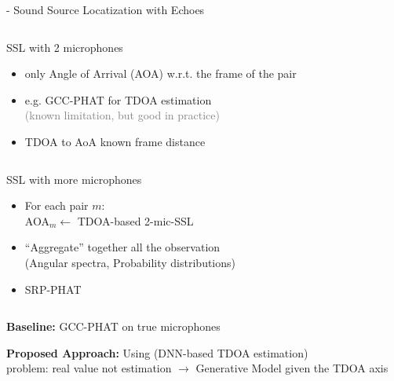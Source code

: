 \begin{frame}{\mirage - Sound Source Locatization with Echoes}

    \begin{columns}
        \begin{block}{SSL with 2 microphones}
            \begin{itemize}
                \item[1.] only Angle of Arrival (AOA) w.r.t. the frame of the pair
                \item e.g. GCC-PHAT for TDOA estimation
                \\\textcolor{gray}{(known limitation, but good in practice)}
                \item TDOA to AoA known frame distance
            \end{itemize}
        \end{block}
    \end{columns}

    \begin{columns}
        \begin{block}{SSL with more microphones}
            \begin{itemize}
                \item[1.] For each pair $m$:
                \\\hspace{1em} AOA$_m \gets$ TDOA-based 2-mic-SSL
                \item[2.] ``Aggregate''  together all the observation
                \\(Angular spectra, Probability distributions)
                \item[eg.] SRP-PHAT
            \end{itemize}
        \end{block}
    \end{columns}

    \begin{block}{\textbf{Baseline:}}
        GCC-PHAT on true microphones
    \end{block}

    \begin{block}{\textbf{Proposed Approach:}}
        Using \lantern (DNN-based TDOA estimation)
        \\problem: real value not estimation $\to$ Generative Model given the TDOA axis
    \end{block}
\end{frame}

